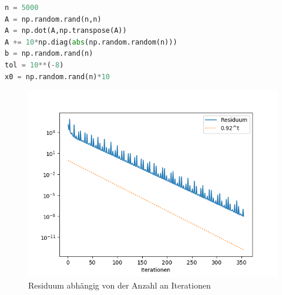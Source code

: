 \begin{lstlisting}[language=Python]
n = 5000
A = np.random.rand(n,n)
A = np.dot(A,np.transpose(A))
A += 10*np.diag(abs(np.random.random(n)))
b = np.random.rand(n)
tol = 10**(-8)
x0 = np.random.rand(n)*10
\end{lstlisting}

\begin{figure}
    \centering
    \includegraphics[width=\linewidth]{Aufgabe_1/plot_b.png}
    \caption{Residuum abhängig von der Anzahl an Iterationen}
    \label{fig:my_label}
\end{figure}
\FloatBarrier
